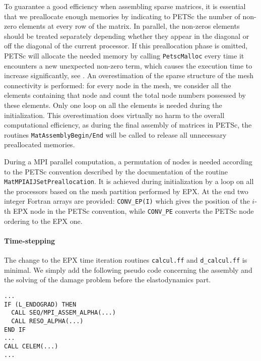 To guarantee a good efficiency when assembling sparse matrices, it is essential that we preallocate enough memories by indicating to PETSc the number of non-zero elements at every row of the matrix. In parallel, the non-zeros elements should be treated separately depending whether they appear in the diagonal or off the diagonal of the current processor. If this preallocation phase is omitted, PETSc will allocate the needed memory by calling \texttt{PetscMalloc} every time it encounters a new unexpected non-zero term, which causes the execution time to increase significantly, see \cite{PETSc:2015}. An overestimation of the sparse structure of the mesh connectivity is performed: for every node in the mesh, we consider all the elements containing that node and count the total node numbers possessed by these elements. Only one loop on all the elements is needed during the initialization. This overestimation does virtually no harm to the overall computational efficiency, as during the final assembly of matrices in PETSc, the routines \texttt{MatAssemblyBegin/End} will be called to release all unnecessary preallocated memories.

During a MPI parallel computation, a permutation of nodes is needed according to the PETSc convention described by the documentation of the routine \texttt{MatMPIAIJSetPreallocation}. It is achieved during initialization by a loop on all the processors based on the mesh partition performed by EPX. At the end two integer Fortran arrays are provided: \texttt{CONV\_EP(I)} which gives the position of the $i$-th EPX node in the PETSc convention, while \texttt{CONV\_PE} converts the PETSc node ordering to the EPX one.

\paragraph{Time-stepping} The change to the EPX time iteration routines \texttt{calcul.ff} and \texttt{d\_calcul.ff} is minimal. We simply add the following pseudo code concerning the assembly and the solving of the damage problem before the elastodynamics part.
\begin{mdframed}[hidealllines=true,backgroundcolor=gray!20]
\begin{verbatim}
...
IF (L_ENDOGRAD) THEN
  CALL SEQ/MPI_ASSEM_ALPHA(...)
  CALL RESO_ALPHA(...)
END IF
...
CALL CELEM(...)
...
\end{verbatim}
\end{mdframed}


